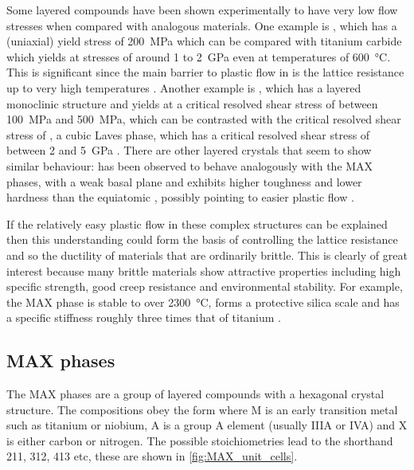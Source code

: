 




Some layered compounds have been shown experimentally to have very low flow stresses when compared with analogous materials. One example is , which has a (uniaxial) yield stress of \SI{200}{\mega\pascal} \cite{Barsoum2011} which can be compared with titanium carbide which yields at stresses of around \num{1} to \SI{2}{\giga\pascal} even at temperatures of \SI{600}{\celsius}. This is significant since the main barrier to plastic flow in  is the lattice resistance up to very high temperatures \cite{Hollox1966}. Another example is , which has a layered monoclinic structure and yields at a critical resolved shear stress of between \SI{100}{\mega\pascal} and \SI{500}{\mega\pascal}, which can be contrasted with the critical resolved shear stress of , a cubic Laves phase, which has a critical resolved shear stress of between \num{2} and \SI{5}{\giga\pascal} \cite{Korte2012NbCo}. There are other layered crystals that seem to show similar behaviour:  has been observed to behave analogously with the MAX phases, with a weak basal plane \cite{Telle2006} and  exhibits higher toughness and lower hardness than the equiatomic , possibly pointing to easier plastic flow \cite{Sygnatowicz2015}.


If the relatively easy plastic flow in these complex structures can be explained then this understanding could form the basis of controlling the lattice resistance and so the ductility of materials that are ordinarily brittle. This is clearly of great interest because many brittle materials show attractive properties including high specific strength, good creep resistance and environmental stability. For example, the MAX phase  is stable to over \SI{2300}{\celsius}, forms a protective silica scale and has a specific stiffness roughly three times that of titanium \cite{Radovic2013}.

\subsection{MAX phases}

The MAX phases are a group of layered compounds with a hexagonal crystal structure. The compositions obey the form  where M is an early transition metal such as titanium or niobium, A is a group A element (usually IIIA or IVA) and X is either carbon or nitrogen. The possible stoichiometries lead to the shorthand 211, 312, 413 etc, these are shown in \autoref{fig:MAX_unit_cells}.

